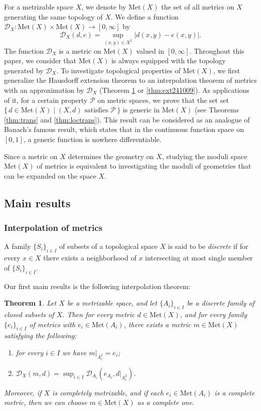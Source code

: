 \documentclass[a4paper, 12pt]{amsart}
\theoremstyle{plain}
\newtheorem{thm}{Theorem}[section]
\theoremstyle{definition}
\theoremstyle{remark}
\newcommand{\met}[1]{\mathrm{Met}(#1)}
\newcommand{\metdis}{\mathcal{D}}
\begin{document}
For a metrizable space 
$X$, 
we denote by 
$\met{X}$
 the set of all metrics on 
 $X$ 
generating 
the same topology of 
$X$. 
We define a function 
$\metdis_{X}: \met{X}\times \met{X}\to [0, \infty]$
 by 
 \[
\metdis_{X}(d, e)=\sup_{(x, y)\in X^2}|d(x, y)-e(x, y)|. 
 \]
The function 
$\metdis_{X}$
 is a metric on 
 $\met{X}$ 
 valued in 
 $[0, \infty]$. 
Throughout this paper, 
we consider that 
$\met{X}$
 is  always equipped with the topology generated by 
$\metdis_{X}$. 
To investigate 
topological properties of 
$\met{X}$, 
we
first  generalize the Hausdorff extension theorem to an interpolation theorem  of metrics with an approximation by 
$\metdis_{X}$
(Theorem
 \ref{thm:interpolate} or 
\ref{thm:ext241009}). 
As applications of it, 
for a
certain 
 property 
$\mathcal{P}$ on metric spaces, 
we prove that 
the set set 
$\{\, d\in \met{X}\mid\text{$(X, d)$ satisfies $\mathcal{P}$}\, \}$
is generic in 
$\met{X}$
(see Theorems \ref{thm:trans} and \ref{thm:loctrans}). 
This result 
can be considered as an analogue of
 Banach's famous result, which states 
  that 
in the continuous  function space on $[0, 1]$, 
a generic function is nowhere differentiable. 

Since a metric on 
$X$ 
determines the geometry on
 $X$, 
 studying the moduli space 
 $\met{X}$ 
 of metrics is equivalent to investigating the moduli of geometries that can be expanded   on the space
  $X$.





\subsection{Main results}

\subsubsection{Interpolation of metrics}
A family 
$\{S_{i}\}_{i\in I}$ 
of subsets of a topological space 
$X$ 
is said to be 
\emph{discrete} if for every 
$x\in X$
 there exists a neighborhood of
  $x$ intersecting at most single member of 
 $\{S_{i}\}_{i\in I}$. 

Our  first main results is the following interpolation theorem: 
\begin{thm}\label{thm:interpolate}
Let 
$X$ 
be a metrizable space, and let 
$\{A_{i}\}_{i\in I}$ 
be a discrete family of closed subsets of 
$X$. 
Then for every metric  
$d\in \met{X}$,   
and for every 
family 
$\{e_{i}\}_{i\in I}$ 
of metrics with 
$e_{i}\in \met{A_{i}}$, 
 there exists a metric 
 $m\in \met{X}$ 
 satisfying the following: 
\begin{enumerate}
\item for every 
$i\in I$ 
we have 
$m|_{A_{i}^2}=e_{i}$;
\item 
$\metdis_{X}(m, d)= \sup_{i\in I}\metdis_{A_{i}}(e_{A_{i}}, d|_{A_{i}^2})$. 
\end{enumerate}
Moreover, if 
$X$ 
is completely metrizable,  
and if each 
$e_{i}\in \met{A_{i}}$ 
is  a complete metric, then we can choose 
$m\in \met{X}$ 
as a complete one. 
\end{thm}
\end{document}
